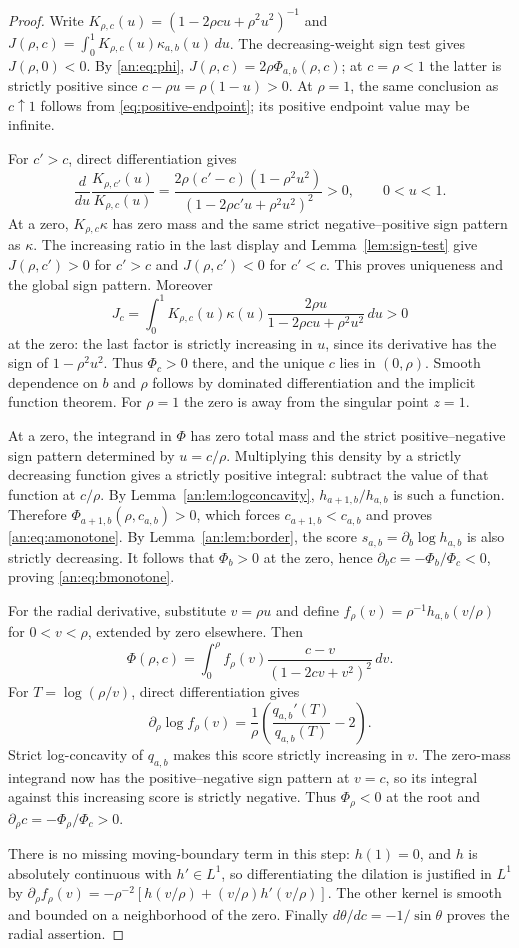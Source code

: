 \documentclass[11pt]{article}
\numberwithin{equation}{section}
\theoremstyle{plain}
\theoremstyle{definition}
\theoremstyle{remark}
\begin{document}
\begin{proof}
Write $K_{\rho,c}(u)=(1-2\rho cu+\rho^2u^2)^{-1}$ and
$J(\rho,c)=\int_0^1K_{\rho,c}(u)\kappa_{a,b}(u)\,du$.
The decreasing-weight sign test gives $J(\rho,0)<0$.
By \eqref{an:eq:phi}, $J(\rho,c)=2\rho\Phi_{a,b}(\rho,c)$;
at $c=\rho<1$ the latter is strictly positive since
$c-\rho u=\rho(1-u)>0$. At $\rho=1$, the same conclusion as
$c\uparrow1$ follows from \eqref{eq:positive-endpoint};
its positive endpoint value may be infinite.

For $c'>c$, direct differentiation gives
\[
 \frac{d}{du}\frac{K_{\rho,c'}(u)}{K_{\rho,c}(u)}
 =\frac{2\rho(c'-c)(1-\rho^2u^2)}
 {(1-2\rho c'u+\rho^2u^2)^2}>0,
 \qquad 0<u<1.
\]
At a zero, $K_{\rho,c}\kappa$ has zero mass and the same strict
negative--positive sign pattern as $\kappa$. The increasing ratio in
the last display and Lemma~\ref{lem:sign-test} give $J(\rho,c')>0$ for
$c'>c$ and $J(\rho,c')<0$ for $c'<c$. This proves uniqueness and the
global sign pattern. Moreover
\[
 J_c=\int_0^1K_{\rho,c}(u)\kappa(u)
            \frac{2\rho u}{1-2\rho cu+\rho^2u^2}\,du>0
\]
at the zero: the last factor is strictly increasing in $u$, since its
derivative has the sign of $1-\rho^2u^2$. Thus $\Phi_c>0$ there,
and the unique $c$ lies in $(0,\rho)$.
Smooth dependence on $b$ and $\rho$ follows by dominated
differentiation and the implicit function theorem. For $\rho=1$
the zero is away from the singular point $z=1$.

At a zero, the integrand in $\Phi$ has zero total mass and the strict
positive--negative sign pattern determined by $u=c/\rho$.
Multiplying this density by a strictly decreasing function gives a
strictly positive integral: subtract the value of that function at
$c/\rho$. By Lemma~\ref{an:lem:logconcavity},
$h_{a+1,b}/h_{a,b}$ is such a function. Therefore
$\Phi_{a+1,b}(\rho,c_{a,b})>0$, which forces
$c_{a+1,b}<c_{a,b}$ and proves \eqref{an:eq:amonotone}.
By Lemma~\ref{an:lem:border}, the score
$s_{a,b}=\partial_b\log h_{a,b}$ is also strictly decreasing.
It follows that $\Phi_b>0$ at the zero, hence
$\partial_bc=-\Phi_b/\Phi_c<0$, proving \eqref{an:eq:bmonotone}.

For the radial derivative, substitute $v=\rho u$ and define
$f_\rho(v)=\rho^{-1}h_{a,b}(v/\rho)$ for $0<v<\rho$, extended
by zero elsewhere. Then
\[
 \Phi(\rho,c)=\int_0^\rho f_\rho(v)
       \frac{c-v}{(1-2cv+v^2)^2}\,dv.
\]
For $T=\log(\rho/v)$, direct differentiation gives
\[
 \partial_\rho\log f_\rho(v)
 =\frac1\rho\left(\frac{q_{a,b}'(T)}{q_{a,b}(T)}-2\right).
\]
Strict log-concavity of $q_{a,b}$ makes this score strictly increasing
in $v$. The zero-mass integrand now has the positive--negative sign
pattern at $v=c$, so its integral against this increasing score is
strictly negative. Thus $\Phi_\rho<0$ at the root and
$\partial_\rho c=-\Phi_\rho/\Phi_c>0$.

There is no missing moving-boundary term in this step: $h(1)=0$,
and $h$ is absolutely continuous with $h'\in L^1$, so differentiating
the dilation is justified in $L^1$ by
$\partial_\rho f_\rho(v)=-\rho^{-2}[h(v/\rho)+(v/\rho)h'(v/\rho)]$.
The other kernel is smooth and bounded on a neighborhood of the zero.
Finally $d\theta/dc=-1/\sin\theta$ proves the radial assertion.
\end{proof}
\end{document}
